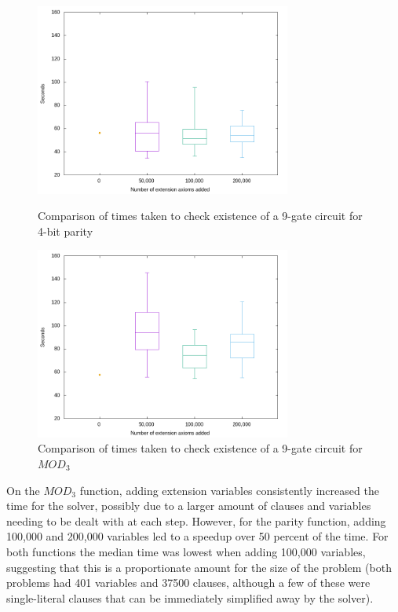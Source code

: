 \documentclass{article}
\begin{document}
\begin{figure}[h!]
  \centering
  \includegraphics[width=0.75\textwidth]{images/extvars/boxplot_4parity_medians.png}
  \caption{Comparison of times taken to check existence of a 9-gate circuit for 4-bit parity  \label{fig:extparity}}

  \centering
  \includegraphics[width=0.75\textwidth]{images/extvars/boxplot_4mod3_medians.png}
  \caption{Comparison of times taken to check existence of a 9-gate circuit for \(MOD_3\)  \label{fig:extmod3}}
\end{figure}

On the \(MOD_3\) function, adding extension variables consistently increased the time for the solver, possibly due to a larger amount of clauses and variables needing to be dealt with at each step. However, for the parity function, adding 100,000 and 200,000 variables led to a speedup over 50 percent of the time. For both functions the median time was lowest when adding 100,000 variables, suggesting that this is a proportionate amount for the size of the problem (both problems had 401 variables and 37500 clauses, although a few of these were single-literal clauses that can be immediately simplified away by the solver).
\end{document}
